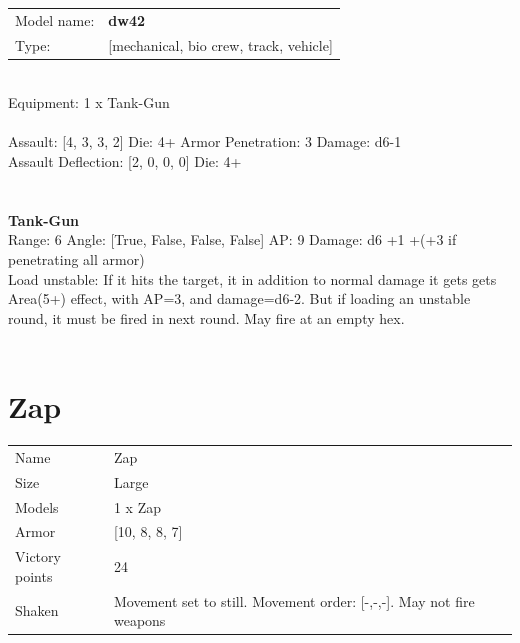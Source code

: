 \begin{tabular}{ll}
Model name: & {\bf dw42 } \\
Type: & [mechanical, bio crew, track, vehicle] \\
\end{tabular}
\ \\
Equipment: 1 x Tank-Gun \\
\ \\
Assault: [4, 3, 3, 2] Die: 4+ Armor Penetration: 3 Damage: d6-1 \\
Assault Deflection: [2, 0, 0, 0] Die: 4+\\
\indent  
\ \\

\ \\
{\bf Tank-Gun } \\



Range: 6  Angle: [True, False, False, False] AP: 9 Damage: d6 +1 +(+3 if penetrating all armor) \\
Load unstable: If it hits the target, it in addition to normal damage it gets gets Area(5+) effect, with AP=3, and damage=d6-2. But if loading an unstable round, it must be fired in next round. May fire at an empty hex.\\ 




 
\ \\














\clearpage

\section{ Zap }

\begin{tabular}{ll}
  Name & Zap \\
  Size & Large\\
  Models & 1 x Zap\\
  Armor & [10, 8, 8, 7]\\
  Victory points & 24\\
  Shaken & Movement set to still. Movement order: [-,-,-]. May not fire weapons\\
\end{tabular}

